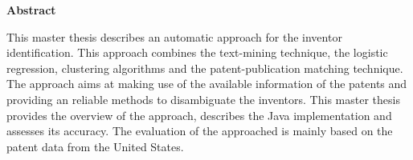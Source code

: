 \thispagestyle{empty}

\centerline{\Large{\textbf{Abstract}}}

\vspace{2cm}
This master thesis describes an automatic approach for the inventor identification. This approach combines the text-mining technique, the logistic regression, clustering algorithms and the patent-publication matching technique. The approach aims at making use of the available information of the patents and providing an reliable methods to disambiguate the inventors. This master thesis provides the overview of the approach, describes the Java implementation and assesses its accuracy. The evaluation of the approached is mainly based on the patent data from the United States.


\newpage
\thispagestyle{empty}
\rule{0cm}{5cm}